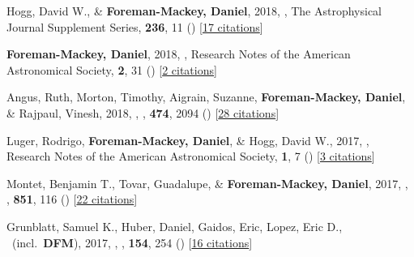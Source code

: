 \item[{\color{numcolor}\scriptsize34}] Hogg, David W., \& \textbf{Foreman-Mackey, Daniel}, 2018, , The Astrophysical Journal Supplement Series, \textbf{236}, 11 () [\href{http://adsabs.harvard.edu/abs/2018ApJS..236...11H}{17 citations}]

\item[{\color{numcolor}\scriptsize33}] \textbf{Foreman-Mackey, Daniel}, 2018, , Research Notes of the American Astronomical Society, \textbf{2}, 31 () [\href{http://adsabs.harvard.edu/abs/2018RNAAS...2a..31F}{2 citations}]

\item[{\color{numcolor}\scriptsize32}] Angus, Ruth, Morton, Timothy, Aigrain, Suzanne, \textbf{Foreman-Mackey, Daniel}, \& Rajpaul, Vinesh, 2018, , \mnras, \textbf{474}, 2094 () [\href{http://adsabs.harvard.edu/abs/2018MNRAS.474.2094A}{28 citations}]

\item[{\color{numcolor}\scriptsize31}] Luger, Rodrigo, \textbf{Foreman-Mackey, Daniel}, \& Hogg, David W., 2017, , Research Notes of the American Astronomical Society, \textbf{1}, 7 () [\href{http://adsabs.harvard.edu/abs/2017RNAAS...1a...7L}{3 citations}]

\item[{\color{numcolor}\scriptsize30}] Montet, Benjamin T., Tovar, Guadalupe, \& \textbf{Foreman-Mackey, Daniel}, 2017, , \apj, \textbf{851}, 116 () [\href{http://adsabs.harvard.edu/abs/2017ApJ...851..116M}{22 citations}]

\item[{\color{numcolor}\scriptsize29}] Grunblatt, Samuel K., Huber, Daniel, Gaidos, Eric, Lopez, Eric D., \etal\ (incl.\ \textbf{DFM}), 2017, , \aj, \textbf{154}, 254 () [\href{http://adsabs.harvard.edu/abs/2017AJ....154..254G}{16 citations}]

